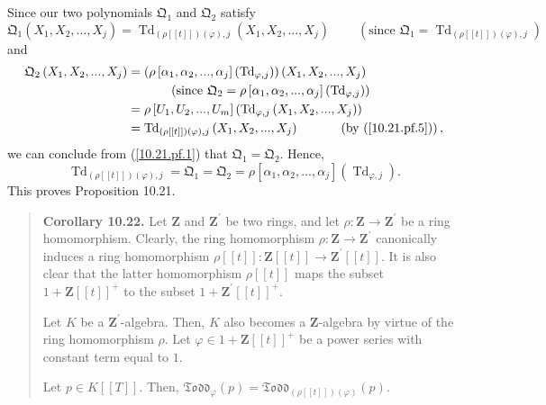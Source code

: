 \documentclass[numbers=enddot,12pt,final,onecolumn,notitlepage]{scrartcl}%
\begin{document}
Since our two polynomials $\mathfrak{Q}_{1}$ and $\mathfrak{Q}_{2}$ satisfy%
\[
\mathfrak{Q}_{1}\left(  X_{1},X_{2},...,X_{j}\right)  =\operatorname*{Td}%
\nolimits_{\left(  \rho\left[  \left[  t\right]  \right]  \right)  \left(
\varphi\right)  ,j}\left(  X_{1},X_{2},...,X_{j}\right)
\ \ \ \ \ \ \ \ \ \ \left(  \text{since }\mathfrak{Q}_{1}=\operatorname*{Td}%
\nolimits_{\left(  \rho\left[  \left[  t\right]  \right]  \right)  \left(
\varphi\right)  ,j}\right)
\]
and%
\begin{align*}
\mathfrak{Q}_{2}\left(  X_{1},X_{2},...,X_{j}\right)   &  =\left(  \rho\left[
\alpha_{1},\alpha_{2},...,\alpha_{j}\right]  \left(  \operatorname*{Td}%
\nolimits_{\varphi,j}\right)  \right)  \left(  X_{1},X_{2},...,X_{j}\right) \\
&  \ \ \ \ \ \ \ \ \ \ \left(  \text{since }\mathfrak{Q}_{2}=\rho\left[
\alpha_{1},\alpha_{2},...,\alpha_{j}\right]  \left(  \operatorname*{Td}%
\nolimits_{\varphi,j}\right)  \right) \\
&  =\rho\left[  U_{1},U_{2},...,U_{m}\right]  \left(  \operatorname*{Td}%
\nolimits_{\varphi,j}\left(  X_{1},X_{2},...,X_{j}\right)  \right) \\
&  =\operatorname*{Td}\nolimits_{\left(  \rho\left[  \left[  t\right]
\right]  \right)  \left(  \varphi\right)  ,j}\left(  X_{1},X_{2}%
,...,X_{j}\right)  \ \ \ \ \ \ \ \ \ \ \left(  \text{by (\ref{10.21.pf.5}%
)}\right)  ,
\end{align*}
we can conclude from (\ref{10.21.pf.1}) that $\mathfrak{Q}_{1}=\mathfrak{Q}%
_{2}$. Hence,%
\[
\operatorname*{Td}\nolimits_{\left(  \rho\left[  \left[  t\right]  \right]
\right)  \left(  \varphi\right)  ,j}=\mathfrak{Q}_{1}=\mathfrak{Q}_{2}%
=\rho\left[  \alpha_{1},\alpha_{2},...,\alpha_{j}\right]  \left(
\operatorname*{Td}\nolimits_{\varphi,j}\right)  .
\]
This proves Proposition 10.21.

\begin{quote}
\textbf{Corollary 10.22.} Let $\mathbf{Z}$ and $\mathbf{Z}^{\prime}$ be two
rings, and let $\rho:\mathbf{Z}\rightarrow\mathbf{Z}^{\prime}$ be a ring
homomorphism. Clearly, the ring homomorphism $\rho:\mathbf{Z}\rightarrow
\mathbf{Z}^{\prime}$ canonically induces a ring homomorphism $\rho\left[
\left[  t\right]  \right]  :\mathbf{Z}\left[  \left[  t\right]  \right]
\rightarrow\mathbf{Z}^{\prime}\left[  \left[  t\right]  \right]  $. It is also
clear that the latter homomorphism $\rho\left[  \left[  t\right]  \right]  $
maps the subset $1+\mathbf{Z}\left[  \left[  t\right]  \right]  ^{+}$ to the
subset $1+\mathbf{Z}^{\prime}\left[  \left[  t\right]  \right]  ^{+}$.

Let $K$ be a $\mathbf{Z}^{\prime}$-algebra. Then, $K$ also becomes a
$\mathbf{Z}$-algebra by virtue of the ring homomorphism $\rho$. Let
$\varphi\in1+\mathbf{Z}\left[  \left[  t\right]  \right]  ^{+}$ be a power
series with constant term equal to $1$.

Let $p\in K\left[  \left[  T\right]  \right]  $. Then, $\mathfrak{Todd}%
_{\varphi}\left(  p\right)  =\mathfrak{Todd}_{\left(  \rho\left[  \left[
t\right]  \right]  \right)  \left(  \varphi\right)  }\left(  p\right)  $.
\end{quote}
\end{document}
